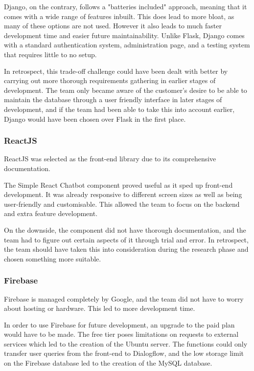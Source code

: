 \documentclass{l3proj}
\begin{document}
Django, on the contrary, follows a "batteries included" approach, meaning that it comes with a wide range of features inbuilt. This does lead to more bloat, as many of these options are not used. However it also leads to much faster development time and easier future maintainability. Unlike Flask, Django comes with a standard authentication system, administration page, and a testing system that requires little to no setup.

In retrospect, this trade-off challenge could have been dealt with better by carrying out more thorough requirements gathering in earlier stages of development. The team only became aware of the customer's desire to be able to maintain the database through a user friendly interface in later stages of development, and if the team had been able to take this into account earlier, Django would have been chosen over Flask in the first place.


\subsubsection{ReactJS}
\label{subsubsec:reactjs}
ReactJS was selected as the front-end library due to its comprehensive documentation.

The Simple React Chatbot \cite{SIMPLECHATBOT} component proved useful as it sped up front-end development. It was already responsive to different screen sizes as well as being user-friendly and customisable. This allowed the team to focus on the backend and extra feature development.

On the downside, the component did not have thorough documentation, and the team had to figure out certain aspects of it through trial and error. In retrospect, the team should have taken this into consideration during the research phase and chosen something more suitable.


\subsubsection{Firebase}
\label{subsubsec:firebase}
Firebase is managed completely by Google, and the team did not have to worry about hosting or hardware. This led to more development time.

In order to use Firebase for future development, an upgrade to the paid plan would have to be made. The free tier poses limitations on requests to external services which led to the creation of the Ubuntu server. The functions could only transfer user queries from the front-end to Dialogflow, and the low storage limit on the Firebase database led to the creation of the MySQL database.
\end{document}

